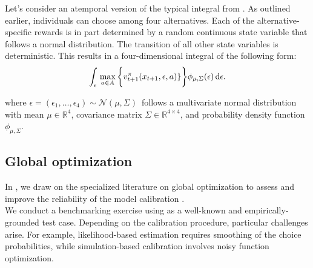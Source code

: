 \noindent Let's consider an atemporal version of the typical integral from \citet{Keane.1994}. As outlined earlier, individuals can choose among four alternatives. Each of the alternative-specific rewards is in part determined by a random continuous state variable that follows a normal distribution. The transition of all other state variables is deterministic. This results in a four-dimensional integral of the following form:
%
\begin{align*}
   \int_{\epsilon}\, \max_{a\in A} \bigg\{v_{t + 1}^\pi(x_{t + 1}, \epsilon, a)\}\bigg\} \phi_{\mu, \Sigma}(\epsilon) \mathop{}\!\mathrm{d}\epsilon.
\end{align*}

\noindent where $\epsilon = (\epsilon_1, \dots, \epsilon_4) \sim \mathcal{N}(\mu, \Sigma)\,$ follows a multivariate normal distribution with mean $\mu \in \mathbb{R}^{4}$, covariance matrix $ \Sigma \in \mathbb{R}^{4 \times 4}$, and probability density function $\phi_{\mu, \Sigma}$.
\subsection{Global optimization}
In \citet{Gabler.2020}, we draw on the specialized literature on global optimization to assess and improve the reliability of the model calibration \citep{Locatelli.2013,Nocedal.2006}.\\

\noindent We conduct a benchmarking exercise using \citet{Keane.1994,Keane.1997} as a well-known and empirically-grounded test case. Depending on the calibration procedure, particular challenges arise. For example, likelihood-based estimation requires smoothing of the choice probabilities, while simulation-based calibration involves noisy function optimization.
